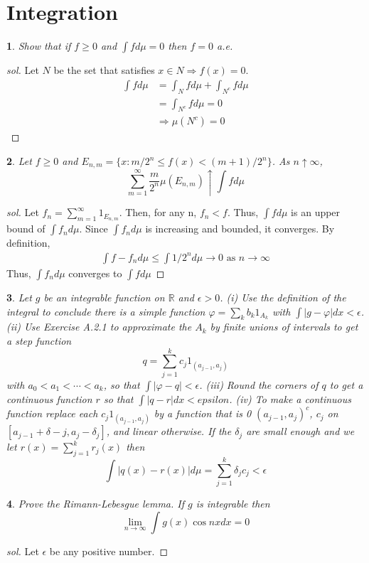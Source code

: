\documentclass{report}
\newtheorem{ex}{}[section]
\begin{document}
\section{Integration}
\begin{ex}
Show that if $f \ge 0$ and $\int f d\mu = 0$ then $f = 0$ a.e.
\end{ex}
\begin{proof}[sol]
Let $N$ be the set that satisfies $x \in N \Rightarrow f(x) = 0$.
\begin{align*}
    \int f d\mu &=  \int_N f d\mu  + \int_{N^c} f d\mu\\
    &= \int_{N^c} f d\mu = 0\\
    &\Rightarrow \mu(N^c) = 0
\end{align*}
\end{proof}
\begin{ex}
Let $f \ge 0$ and $E_{n,m} = \{x : m/2^n \le f(x) < (m+1)/2^n\}$. As $n \uparrow \infty$,
\[\sum_{m=1}^\infty \frac{m}{2^n} \mu(E_{n,m}) \uparrow \int f d\mu\]
\end{ex}
\begin{proof}[sol]
Let $f_n = \sum_{m=1}^\infty 1_{E_{n,m}}$. Then, for any n, $f_n < f$. Thus, $\int f d\mu$ is an upper bound of $\int f_n d\mu$. Since $\int f_n d\mu$ is increasing and bounded, it converges. By definition,
\begin{align*}
    \int f -f_n d\mu \le \int 1/2^n d\mu \to 0 \text{ as } n \to \infty
\end{align*}
Thus, $\int f_n d\mu$ converges to $\int f d\mu$
\end{proof}
\begin{ex}
Let $g$ be an integrable function on $\mathbb{R}$ and $\epsilon > 0$. (i) Use the definition of the integral to conclude there is a simple function $\varphi = \sum_k b_k1_{A_k}$ with $\int |g - \varphi| dx < \epsilon$. (ii) Use Exercise A.2.1 to approximate the $A_k$ by finite unions of intervals to get a step function
\[q = \sum_{j=1}^k c_j 1_{(a_{j-1}, a_j)}\]
with $a_0 < a_1 < \dotsb < a_k$, so that $\int |\varphi-q| < \epsilon$. (iii) Round the corners of $q$ to get a continuous function $r$ so that $\int |q - r| dx < epsilon$.
(iv) To make a continuous function replace each $c_j1_{(a_{j-1},a_j)}$ by a function
that is 0 $(a_{j-1}, a_j)^c$, $c_j$ on $[a_{j-1} + \delta - j, a_j - \delta_j ]$, and linear otherwise. If the $\delta_j$ are small enough and we let $r(x) = \sum^k_{j=1} r_j(x)$ then
\[\int |q(x) - r(x)|d\mu = \sum_{j=1}^k \delta_j c_j <\epsilon\]
\end{ex}
\begin{ex}
Prove the Rimann-Lebesgue lemma. If $g$ is integrable then
\[\lim_{n\to\infty} \int g(x) \cos nx dx  = 0\]
\end{ex}
\begin{proof}[sol]
Let $\epsilon$ be any positive number. 
\end{proof}
\end{document}
